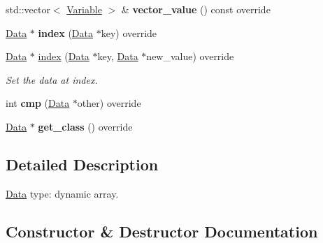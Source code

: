\begin{DoxyCompactItemize}
\item 
std\+::vector$<$ \hyperlink{classcreek_1_1_variable}{Variable} $>$ \& {\bfseries vector\+\_\+value} () const  override\hypertarget{classcreek_1_1_vector_a29d0b879449d5f6d09c0f9c9fb580cde}{}\label{classcreek_1_1_vector_a29d0b879449d5f6d09c0f9c9fb580cde}

\item 
\hyperlink{classcreek_1_1_data}{Data} $\ast$ {\bfseries index} (\hyperlink{classcreek_1_1_data}{Data} $\ast$key) override\hypertarget{classcreek_1_1_vector_a52940347265928be7531e94036aaf6b5}{}\label{classcreek_1_1_vector_a52940347265928be7531e94036aaf6b5}

\item 
\hyperlink{classcreek_1_1_data}{Data} $\ast$ \hyperlink{classcreek_1_1_vector_ab1b3571fecb1b56533f64b501a743017}{index} (\hyperlink{classcreek_1_1_data}{Data} $\ast$key, \hyperlink{classcreek_1_1_data}{Data} $\ast$new\+\_\+value) override\hypertarget{classcreek_1_1_vector_ab1b3571fecb1b56533f64b501a743017}{}\label{classcreek_1_1_vector_ab1b3571fecb1b56533f64b501a743017}

\begin{DoxyCompactList}\small\item\em Set the data at index. \end{DoxyCompactList}\item 
int {\bfseries cmp} (\hyperlink{classcreek_1_1_data}{Data} $\ast$other) override\hypertarget{classcreek_1_1_vector_ad7e0ee1323104840979d0a1a92fcdd20}{}\label{classcreek_1_1_vector_ad7e0ee1323104840979d0a1a92fcdd20}

\item 
\hyperlink{classcreek_1_1_data}{Data} $\ast$ {\bfseries get\+\_\+class} () override\hypertarget{classcreek_1_1_vector_ae912c5e0a1c7898fc5575f11b87bf50a}{}\label{classcreek_1_1_vector_ae912c5e0a1c7898fc5575f11b87bf50a}

\end{DoxyCompactItemize}


\subsection{Detailed Description}
\hyperlink{classcreek_1_1_data}{Data} type\+: dynamic array. 

\subsection{Constructor \& Destructor Documentation}
